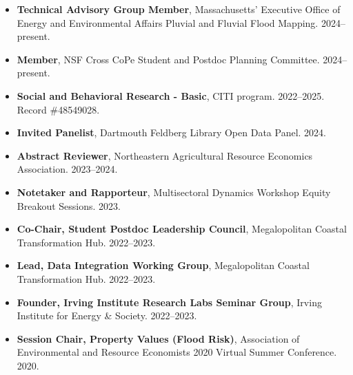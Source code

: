 \documentclass[10pt,oneside]{article}
\begin{document}
\begin{itemize}[label={}]
  
  \item \textbf{Technical Advisory Group Member}, Massachusetts’ Executive Office of Energy and Environmental Affairs Pluvial and Fluvial Flood Mapping. 2024--present.
  
  \item \textbf{Member}, NSF Cross CoPe Student and Postdoc Planning Committee. 2024--present.
  
  \item \textbf{Social and Behavioral Research - Basic}, CITI program. 2022--2025.\\Record \#48549028.
  
  \item \textbf{Invited Panelist}, Dartmouth Feldberg Library Open Data Panel. 2024.
  
  \item \textbf{Abstract Reviewer}, Northeastern Agricultural Resource Economics Association. 2023--2024.
  
  \item \textbf{Notetaker and Rapporteur}, Multisectoral Dynamics Workshop Equity Breakout Sessions. 2023.
  
  \item \textbf{Co-Chair, Student Postdoc Leadership Council}, Megalopolitan Coastal Transformation Hub. 2022--2023.
  
  \item \textbf{Lead, Data Integration Working Group}, Megalopolitan Coastal Transformation Hub. 2022--2023.
  
  \item \textbf{Founder, Irving Institute Research Labs Seminar Group}, Irving Institute for Energy \& Society. 2022--2023.
  
  \item \textbf{Session Chair, Property Values (Flood Risk)}, Association of Environmental and Resource Economists 2020 Virtual Summer Conference. 2020.
  
\end{itemize}
\end{document}
